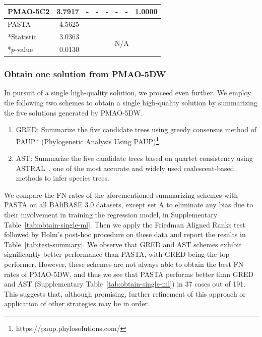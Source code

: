 \documentclass[a4paper,fleqn, review]{cas-dc}
\begin{document}
\begin{table}[pos=!htbp, align=\centering, width=17cm]
\begin{tabular}{|l|r||cccccc|}
		 PMAO-5C2 & 3.7917 & \multicolumn{1}{c|}{-} & \multicolumn{1}{c|}{-} & \multicolumn{1}{c|}{-} & \multicolumn{1}{c|}{-} & \multicolumn{1}{c|}{-} & \multicolumn{1}{r|}{1.0000} \\
		\hline
		PASTA & 4.5625 & \multicolumn{1}{c|}{-} & \multicolumn{1}{c|}{-} & \multicolumn{1}{c|}{-} & \multicolumn{1}{c|}{-} & \multicolumn{1}{c|}{-} & - \\
		\hline \hline
		*Statistic &    3.0363   & \multicolumn{6}{c|}{\multirow{2}[4]{*}{N/A}} \\
		\cline{1-2}    *$p$-value &  0.0130     & \multicolumn{6}{c|}{} \\
		\hline
	\end{tabular}%
	\label{tab:test-ml-weights}%
\end{table}%



\subsubsection{Obtain one solution from PMAO-5DW}
In pursuit of a single high-quality solution, we proceed even further. We employ the following two schemes to obtain a single high-quality solution by summarizing the five solutions generated by PMAO-5DW.
\begin{enumerate}
\item GRED: Summarize the five candidate trees using greedy consensus method of PAUP* (Phylogenetic Analysis Using PAUP)\footnote{https://paup.phylosolutions.com/}.
	\item AST: Summarize the five candidate trees based on quartet consistency using ASTRAL~\cite{zhang2018astral}, one of the most accurate and widely used coalescent-based methods to infer species trees.
\end{enumerate}
We compare the FN rates of the aforementioned summarizing schemes with PASTA on all BAliBASE 3.0 datasets, except set A to eliminate any bias due to their involvement in training the regression model, in Supplementary Table~\ref{tab:obtain-single-ml}. Then we apply the Friedman Aligned Ranks test followed by Holm's post-hoc procedure on these data and report the results in Table~\ref{tab:test-summary}. We observe that GRED and AST schemes exhibit significantly better performance than PASTA, with GRED being the top performer. However, these schemes are not always able to obtain the best FN rates of PMAO-5DW, and thus we see that PASTA performs better than GRED and AST (Supplementary Table~\ref{tab:obtain-single-ml}) in 37 cases out of 191. This suggests that, although promising, further refinement of this approach or application of other strategies may be in order.
\end{document}
